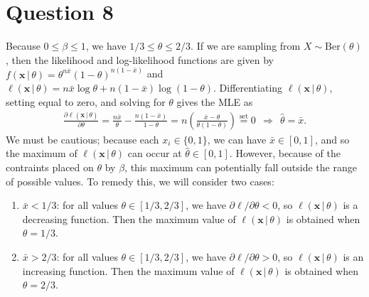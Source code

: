 \documentclass[10pt]{article}
\begin{document}
\section{Question 8} \noindent
Because \(0 \le \beta \le 1\), we have \(1/3 \le \theta \le 2/3\). If we are sampling from \(X \sim \mathrm{Ber}(\theta)\), then the likelihood 
and log-likelihood functions are given by 
\(f(\mathbf{x} \,|\, \theta) = \theta^{n \bar{x}}(1 - \theta)^{n(1 - \bar{x})}\) and 
\(\ell(\mathbf{x} \,|\, \theta) = n \bar{x} \log \theta + n(1 - \bar{x}) \log (1 - \theta).\)
Differentiating \(\ell(\mathbf{x} \,|\, \theta)\), setting equal to zero, and solving for \(\theta\) gives the MLE as
\begin{align*}
    \frac{\partial \ell(\mathbf{x} \,|\, \theta)}{\partial \theta}
    = \frac{n \bar x}{\theta} - \frac{n(1 - \bar{x})}{1 - \theta}
    = n \left( \frac{\bar{x} - \theta}{\theta(1 - \theta)} \right)
    \overset{\text{set}}{=} 0
    ~~\Longrightarrow~~ \hat{\theta} = \bar{x}.
\end{align*}
We must be cautious; because each \(x_i \in \{0,1\}\), we can have \(\bar{x} \in [0,1]\), and so the maximum of \(\ell(\mathbf{x} \,|\, \theta)\)
can occur at \(\hat{\theta} \in [0,1]\). However, because of the contraints placed on \(\theta\) by \(\beta\), this maximum can potentially fall outside the range of 
possible values. To remedy this, we will consider two cases:
\begin{enumerate}
    \item \(\bar{x} < 1/3\): for all values \(\theta \in [1/3, 2/3]\), we have \(\partial \ell / \partial \theta < 0 \), so \(\ell(\mathbf{x} \,|\, \theta)\)
    is a decreasing function. Then the maximum value of \(\ell(\mathbf{x} \,|\, \theta)\) is obtained when \(\theta = 1/3\).
    \item \(\bar{x} > 2/3\): for all values \(\theta \in [1/3, 2/3]\), we have \(\partial \ell / \partial \theta > 0 \), so \(\ell(\mathbf{x} \,|\, \theta)\)
    is an increasing function. Then the maximum value of \(\ell(\mathbf{x} \,|\, \theta)\) is obtained when \(\theta = 2/3\).
\end{enumerate}
\end{document}
